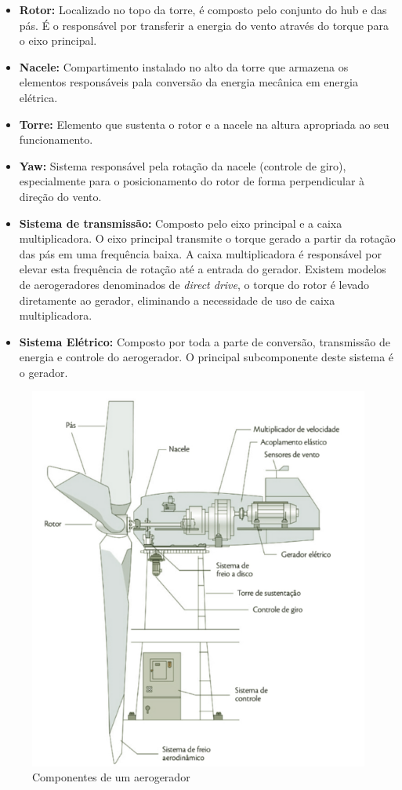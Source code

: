 \begin{itemize}
    \item \textbf{Rotor:} Localizado no topo da torre, é composto pelo conjunto do hub e das pás. É o responsável por transferir a energia do vento através do torque para o eixo principal.
    \item \textbf{Nacele:} Compartimento instalado no alto da torre que armazena os elementos responsáveis pala conversão da energia mecânica em energia elétrica.
    \item \textbf{Torre:} Elemento que sustenta o rotor e a nacele na altura apropriada ao seu funcionamento.
    \item \textbf{Yaw:} Sistema responsável pela rotação da nacele (controle de giro), especialmente para o posicionamento do rotor de forma perpendicular à direção do vento.
    \item \textbf{Sistema de transmissão:} Composto pelo eixo principal e a caixa multiplicadora. O eixo principal transmite o torque gerado a partir da rotação das pás em uma frequência baixa. A caixa multiplicadora é responsável por elevar esta frequência de rotação até a entrada do gerador. Existem modelos de aerogeradores denominados de \textit{direct drive}, o torque do rotor é levado diretamente ao gerador, eliminando a necessidade de uso de caixa multiplicadora.
    \item \textbf{Sistema Elétrico:} Composto por toda a parte de conversão, transmissão de energia e controle do aerogerador. O principal subcomponente deste sistema é o gerador.
\end{itemize}

\begin{figure}[htbp!] \begin{center}
\includegraphics[width=0.75\linewidth]{./figuras/ilustracao-aerogerador}
\caption{Componentes de um aerogerador}
\label{Fig:ilustracaoAerogerador}
\end{center} 
\end{figure}

